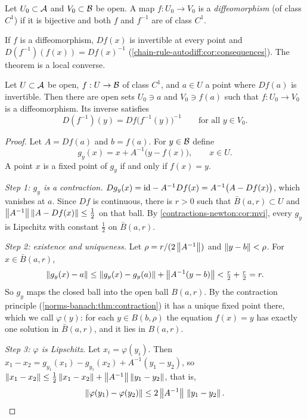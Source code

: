 \begin{notechapter}
\begin{definition}[Diffeomorphism]\label{inverse-implicit:def:diffeo}
Let $U_0\subset\mathcal{A}$ and $V_0\subset\mathcal{B}$ be open. A map
$f:U_0\to V_0$ is a \emph{diffeomorphism} (of class $C^1$) if it is
bijective and both $f$ and $f^{-1}$ are of class $C^1$.
\end{definition}

If $f$ is a diffeomorphism, $Df(x)$ is invertible at every point and
$D(f^{-1})(f(x)) = Df(x)^{-1}$
(\cref{chain-rule-autodiff:cor:consequences}). The theorem is a local
converse.

\begin{theorem}\label{inverse-implicit:thm:inverse}
Let $U\subset\mathcal{A}$ be open, $f:U\to\mathcal{B}$ of class $C^1$, and $a\in U$ a
point where $Df(a)$ is invertible. Then there are open sets $U_0\ni a$
and $V_0\ni f(a)$ such that $f:U_0\to V_0$ is a diffeomorphism. Its
inverse satisfies
\[
  D(f^{-1})(y) = Df\bigl(f^{-1}(y)\bigr)^{-1}
  \qquad\text{for all } y\in V_0 .
\]
\end{theorem}

\begin{proof}
Let $A = Df(a)$ and $b = f(a)$. For $y\in\mathcal{B}$ define
\[
  g_y(x) = x + A^{-1}\bigl(y - f(x)\bigr), \qquad x\in U .
\]
A point $x$ is a fixed point of $g_y$ if and only if $f(x) = y$.

\emph{Step 1: $g_y$ is a contraction.}
$Dg_y(x) = \mathrm{id} - A^{-1}Df(x) = A^{-1}\bigl(A - Df(x)\bigr)$, which
vanishes at $a$. Since $Df$ is continuous, there is $r > 0$ such that
$\bar B(a, r)\subset U$ and $\left\|A^{-1}\right\|\left\|A - Df(x)\right\|\leq\frac12$ on
that ball. By \cref{contractions-newton:cor:mvi}, every $g_y$ is Lipschitz
with constant $\frac12$ on $\bar B(a, r)$.

\emph{Step 2: existence and uniqueness.} Let
$\rho = r/(2\left\|A^{-1}\right\|)$ and $\left\|y - b\right\| < \rho$. For
$x\in\bar B(a, r)$,
\[
  \left\|g_y(x) - a\right\|\leq\left\|g_y(x) - g_y(a)\right\| + \left\|A^{-1}(y - b)\right\|
  < \tfrac r2 + \tfrac r2 = r .
\]
So $g_y$ maps the closed ball into the open ball $B(a, r)$. By the
contraction principle (\cref{norms-banach:thm:contraction}) it has a
unique fixed point there, which we call $\varphi(y)$: for each
$y\in B(b, \rho)$ the equation $f(x) = y$ has exactly one solution in
$\bar B(a, r)$, and it lies in $B(a, r)$.

\emph{Step 3: $\varphi$ is Lipschitz.} Let $x_i = \varphi(y_i)$. Then
$x_1 - x_2 = g_{y_1}(x_1) - g_{y_1}(x_2) + A^{-1}(y_1 - y_2)$, so
$\left\|x_1 - x_2\right\|\leq\frac12\left\|x_1 - x_2\right\|
+ \left\|A^{-1}\right\|\left\|y_1 - y_2\right\|$, that is,
\begin{equation}\label{inverse-implicit:eq:lipschitz}
  \left\|\varphi(y_1) - \varphi(y_2)\right\|
  \leq2\left\|A^{-1}\right\|\,\left\|y_1 - y_2\right\| .
\end{equation}


\end{proof}
\end{notechapter}
